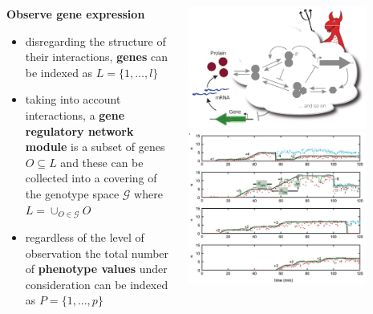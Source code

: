 \begin{frame}
\begin{columns}[c]
\begin{column}{0.5\textwidth}
\begin{block}{\textbf{Observe gene expression}}
\begin{small}
\begin{itemize}
\item disregarding the structure of their interactions, \textbf{genes} can be indexed as $L = \{1, \ldots, l \}$
\item taking into account interactions, a \textbf{gene regulatory network module} is a subset of genes $O \subseteq L$ and these can be collected into a covering of the genotype space $\mathcal{G}$ where $L = \cup_{O \in \mathcal{G}} O$
\item regardless of the level of observation the total number of \textbf{phenotype values} under consideration can be indexed as $P = \{ 1, \ldots, p \} $
\end{itemize}
\end{small}
\end{block}
\end{column}
\begin{column}{0.5\textwidth}
\begin{center}
\includegraphics[width=0.8\textwidth]{fig/geneexpressiondemon.pdf}
\cite{Lestas2010}
\includegraphics[width=0.8\textwidth]{fig/transcriptcounts.png}

\end{center}
\end{column}
\end{columns}
\end{frame}
